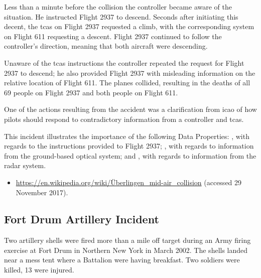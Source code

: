 Less than a minute before the collision the controller became aware of the situation. He instructed Flight 2937 to descend. Seconds after initiating this decent, the \gls{tcas} on Flight 2937 requested a climb, with the corresponding system on Flight 611 requesting a descent. Flight 2937 continued to follow the controller's direction, meaning that both aircraft were descending.

Unaware of the \gls{tcas} instructions the controller repeated the request for Flight 2937 to descend; he also provided Flight 2937 with misleading \gls{information} on the relative location of Flight 611. The planes collided, resulting in the deaths of all 69 people on Flight 2937 and both people on Flight 611.

One of the actions resulting from the accident was a clarification from \gls{icao} of how pilots should respond to contradictory \gls{information} from a controller and \gls{tcas}.

This incident illustrates the importance of the following Data Properties: , with regards to the instructions provided to Flight 2937; , with regards to \gls{information} from the ground-based optical system; and , with regards to \gls{information} from the radar system.

\begin{samepage}
\begin{itemize}
	\item \raggedright{\href{https://en.wikipedia.org/wiki/\%C3\%9Cberlingen_mid-air_collision}{https://en.wikipedia.org/wiki/\"Uberlingen\_mid-air\_collision} (accessed 29 November 2017).}
\end{itemize}
\end{samepage}


\subsection{Fort Drum Artillery Incident} \label{bkm:incacc:fortdrum}
Two artillery shells were fired more than a mile off target during an Army firing exercise at Fort Drum in Northern New York in March 2002. The shells landed near a mess tent where a Battalion were having breakfast. Two soldiers were killed, 13 were injured. 

